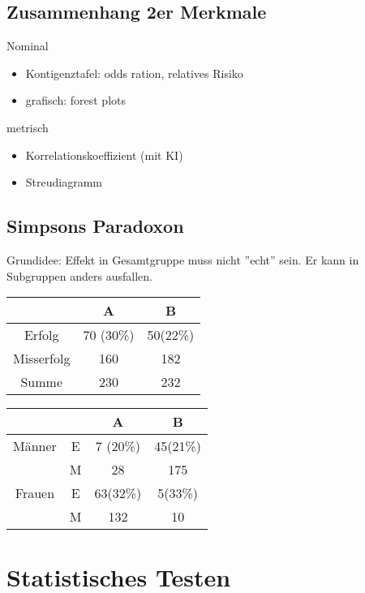 \documentclass[10pt,a4paper]{article}
\theoremstyle{definition}
\begin{document}
\subsection{Zusammenhang 2er Merkmale}
Nominal
\begin{itemize}
	\item Kontigenztafel: odds ration, relatives Risiko
	\item grafisch: forest plots
\end{itemize}
metrisch
\begin{itemize}
	\item Korrelationskoeffizient (mit KI)
	\item Streudiagramm
\end{itemize}

\subsection{Simpsons Paradoxon}
Grundidee: Effekt in Gesamtgruppe muss nicht ''echt'' sein. Er kann in Subgruppen anders ausfallen.

\begin{tabular}{|c|c|c|}
	\hline 
	& A & B \\ 
	\hline 
	Erfolg & 70 (30\%) &  50(22\%) \\ 
	\hline 
	Misserfolg & 160 & 182 \\ 
	\hline 
	Summe & 230 & 232 \\ 
	\hline 
\end{tabular} 

\begin{tabular}{|c|c|c|c|}
	\hline 
	&   & A & B \\ 
	\hline 
	Männer & E & 7 (20\%) & 45(21\%) \\ 
	\hline 
	& M & 28 & 175 \\ 
	\hline 
	Frauen & E & 63(32\%) & 5(33\%) \\ 
	\hline 
	& M  & 132 & 10 \\ 
	\hline 
\end{tabular} 

\section{Statistisches Testen}
\end{document}
